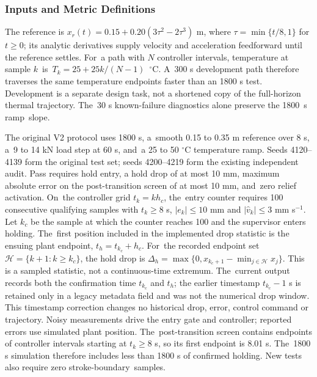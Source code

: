 \documentclass[machines,article,submit,pdftex,moreauthors]{Definitions/mdpi}
\begin{document}
\subsubsection{Inputs and Metric Definitions}

The reference is $x_r(t)=0.15+0.20(3\tau^2-2\tau^3)$ m, where $\tau=\min\{t/8,1\}$ for $t\ge0$; its analytic derivatives supply velocity and acceleration feedforward until the reference settles. For~a path with $N$ controller intervals, temperature at sample \mbox{$k$ is $T_k=25+25k/(N-1)$ $^\circ$C}. A~300 s development path therefore traverses the same temperature endpoints faster than an 1800 s test. Development is a separate design task, not a shortened copy of the full-horizon thermal trajectory. The~30 s known-failure diagnostics alone preserve the \mbox{1800 s} ramp~slope.

The original V2 protocol uses 1800 s, a~smooth 0.15 to 0.35 m reference over 8 s, a~9 to 14 kN load step at 60 s, and~a 25 to 50 $^\circ$C temperature ramp. Seeds 4120--4139 form the original test set; seeds 4200--4219 form the existing independent audit. Pass requires hold entry, a hold drop of at most 10 mm, maximum absolute error on the post-transition screen of at most 10 mm, and~zero relief activation. On~the controller grid $t_k=kh_c$, the~entry counter requires 100 consecutive qualifying samples with $t_k\geq8$ s, $|e_k|\leq10$ mm and $|\hat v_k|\leq3$ mm s$^{-1}$. Let $k_c$ be the sample at which the counter reaches 100 and the supervisor enters holding. The~first position included in the implemented drop statistic is the ensuing plant endpoint, $t_h=t_{k_c}+h_c$. For~the recorded endpoint set $\mathcal H=\{k+1:k\geq k_c\}$, the hold drop is $\Delta_h=\max\{0,x_{k_c+1}-\min_{j\in\mathcal H}x_j\}$. This is a sampled statistic, not a continuous-time extremum. The~current output records both the confirmation time $t_{k_c}$ and $t_h$; the earlier timestamp $t_{k_c}-1$ s is retained only in a legacy metadata field and was not the numerical drop window. This timestamp correction changes no historical drop, error, control command or trajectory. Noisy measurements drive the entry gate and controller; reported errors use simulated plant position. The~post-transition screen contains endpoints of controller intervals starting at $t_k\geq8$ s, so its first endpoint is 8.01 s. The~1800 s simulation therefore includes less than 1800 s of confirmed holding. New tests also require zero stroke-boundary~samples.
\end{document}
